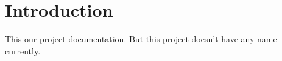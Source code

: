 \hypertarget{index_intro_sec}{}\section{Introduction}\label{index_intro_sec}
This our project documentation. But this project doesn't have any name currently. 